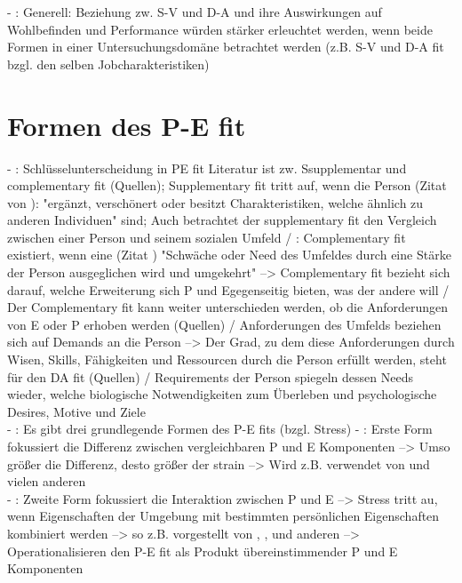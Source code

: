 - \cite[S. 5]{edwards:1990}: Generell: Beziehung zw. S-V und D-A und ihre Auswirkungen auf Wohlbefinden und Performance würden stärker erleuchtet werden, wenn beide Formen in einer Untersuchungsdomäne betrachtet werden (z.B. S-V und D-A fit bzgl. den selben Jobcharakteristiken) \textcite{caplan:1987}

\section{Formen des P-E fit}
\label{ch:notizen:formen}
- \cite[S. 3]{edwards:2007}: Schlüsselunterscheidung in PE fit Literatur ist zw. Ssupplementar und complementary fit (Quellen); Supplementary fit tritt auf, wenn die Person (Zitat von \textcite[S. 269]{muchinsky:1987}): "ergänzt, verschönert oder besitzt Charakteristiken, welche ähnlich zu anderen Individuen" sind; Auch betrachtet der supplementary fit den Vergleich zwischen einer Person und seinem sozialen Umfeld / \cite[S. 4]{edwards:2007}: Complementary fit existiert, wenn eine (Zitat \cite[S. 271]{muchinsky:1987}) "Schwäche oder Need des Umfeldes durch eine Stärke der Person ausgeglichen wird und umgekehrt" --> Complementary fit bezieht sich darauf, welche Erweiterung sich P und Egegenseitig bieten, was der andere will / Der Complementary fit kann weiter unterschieden werden, ob die Anforderungen von E oder P erhoben werden (Quellen) / Anforderungen des Umfelds beziehen sich auf Demands an die Person --> Der Grad, zu dem diese Anforderungen durch Wisen, Skills, Fähigkeiten und Ressourcen durch die Person erfüllt werden, steht für den DA fit (Quellen) / Requirements der Person spiegeln dessen Needs wieder, welche biologische Notwendigkeiten zum Überleben und psychologische Desires, Motive und Ziele \cite{copingAndAdaption:1974} \\
- \cite[S. 5]{edwards:1990}: Es gibt drei grundlegende Formen des P-E fits (bzgl. Stress)
- \cite[S. 5]{edwards:1990}: Erste Form fokussiert die Differenz zwischen vergleichbaren P und E Komponenten --> Umso größer die Differenz, desto größer der strain --> Wird z.B. verwendet von \textcite{mechanismsOfJobStressAndStrain:1982} und vielen anderen \\
- \cite[S. 5]{edwards:1990}: Zweite Form fokussiert die Interaktion zwischen P und E --> Stress tritt au, wenn Eigenschaften der Umgebung mit bestimmten persönlichen Eigenschaften kombiniert werden --> so z.B. vorgestellt von \textcite{cherringtonEngland:1980}, \textcite{lyons:1971}, \textcite{obrien:1980} und anderen --> Operationalisieren den P-E fit als Produkt übereinstimmender P und E Komponenten \\
